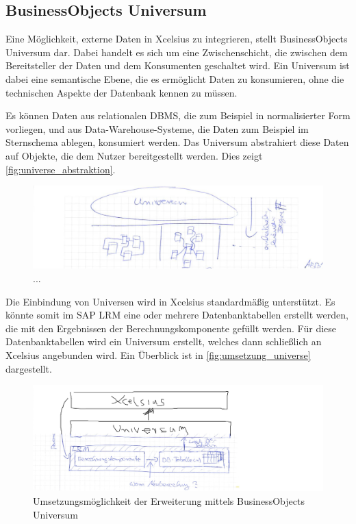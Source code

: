 \begin{onehalfspacing}
\section{BusinessObjects Universum}
Eine Möglichkeit, externe Daten in \gls{Xcelsius} zu integrieren, stellt BusinessObjects Universum dar. Dabei handelt es sich um eine Zwischenschicht, die zwischen dem Bereitsteller der Daten und dem Konsumenten geschaltet wird. Ein Universum ist dabei eine semantische Ebene, die es ermöglicht Daten zu konsumieren, ohne die technischen Aspekte der Datenbank kennen zu müssen.

Es können Daten aus relationalen \gls{DBMS}, die zum Beispiel in normalisierter Form vorliegen, und aus Data-Warehouse-Systeme, die Daten zum Beispiel im Sternschema ablegen, konsumiert werden. Das Universum abstrahiert diese Daten auf Objekte, die dem Nutzer bereitgestellt werden. Dies zeigt \vref{fig:universe_abstraktion}.

\begin{figure}[h]
\centering
\setlength{\unitlength}{1mm}
\includegraphics[width=15cm]{images/universe_ueberblick.jpg}
\caption{...\label{fig:universe_abstraktion}}
\end{figure}  

Die Einbindung von Universen wird in \gls{Xcelsius} standardmäßig unterstützt. Es könnte somit im SAP LRM eine oder mehrere Datenbanktabellen erstellt werden, die mit den Ergebnissen der Berechnungskomponente gefüllt werden. Für diese Datenbanktabellen wird ein Universum erstellt, welches dann schließlich an \gls{Xcelsius} angebunden wird. Ein Überblick ist in \vref{fig:umsetzung_universe} dargestellt.

\begin{figure}[h]
\centering
\setlength{\unitlength}{1mm}
\includegraphics[width=15cm]{images/umsetzung_universe.jpg}
\caption{Umsetzungsmöglichkeit der Erweiterung mittels BusinessObjects Universum \label{fig:umsetzung_universe}}
\end{figure} 


\end{onehalfspacing}
